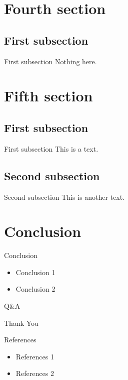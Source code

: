 \documentclass{beamer}
\begin{document}
\section{Fourth section}
\subsection{First subsection}
\begin{frame}{First subsection}
    Nothing here.
\end{frame}


\section{Fifth section}
\subsection{First subsection}
\begin{frame}{First subsection}
    This is a text.
\end{frame}


\subsection{Second subsection}
\begin{frame}{Second subsection}
    This is another text.
\end{frame}


\section{Conclusion}
\begin{frame}{Conclusion}
    \begin{itemize}
        \item Conclusion 1
        \item Conclusion 2
    \end{itemize}
\end{frame}


\begin{frame}{Q\&A}
    \begin{center}
        \Huge \textcolor{MyCyan3}{Thank You}
    \end{center}
\end{frame}
 

\begin{frame}{References}
    \begin{itemize}
        \item References 1
        \item References 2
    \end{itemize}
\end{frame}
\end{document}

